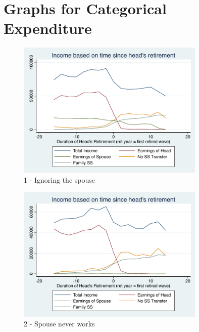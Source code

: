 \documentclass[11pt,onecolumn]{article}
\numberwithin{figure}{section}
\begin{document}

\section{Graphs for Categorical Expenditure}

\begin{figure}[h]
	\caption{1 - Ignoring the spouse}
	\centering
	\includegraphics[width=0.8\textwidth]{../IncomeAroundRetirement/Income_with_spouse_definition_1.pdf}
\end{figure}

\begin{figure}[h]
	\caption{2 - Spouse never works}
	\centering
	\includegraphics[width=0.8\textwidth]{../IncomeAroundRetirement/Income_with_spouse_definition_2.pdf}
\end{figure}
\end{document}
